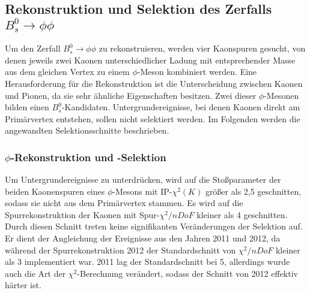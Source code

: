 \documentclass{article}
\begin{document}
\subsection{Rekonstruktion und Selektion des Zerfalls $B_s^0 \rightarrow \phi\phi$}

Um den Zerfall $B_s^0 \rightarrow \phi\phi$ zu rekonstruieren, werden vier Kaonspuren gesucht, von denen jeweils zwei Kaonen unterschiedlicher Ladung mit entsprechender Masse aus dem gleichen Vertex zu einem $\phi$-Meson kombiniert werden. Eine Herausforderung für die Rekonstruktion ist die Unterscheidung zwischen Kaonen und Pionen, da sie sehr ähnliche Eigenschaften besitzen. Zwei dieser $\phi$-Mesonen bilden einen $B_s^0$-Kandidaten. Untergrundereignisse, bei denen Kaonen direkt am Primärvertex entstehen, sollen nicht selektiert werden. Im Folgenden werden die angewandten Selektionsschnitte beschrieben. 

\subsubsection{$\phi$-Rekonstruktion und -Selektion}

Um Untergrundereignisse zu unterdrücken, wird auf die Stoßparameter der beiden Kaonenspuren eines $\phi$-Mesons mit IP-$\chi^2(K)$ größer als 2,5 geschnitten, sodass sie nicht aus dem Primärvertex stammen. 
Es wird auf die Spurrekonstruktion der Kaonen mit Spur-$\chi^2/nDoF$ kleiner als 4 geschnitten. %
Durch diesen Schnitt treten keine signifikanten Veränderungen der Selektion auf. Er dient der Angleichung der Ereignisse aus den Jahren 2011 und 2012, da während der Spurrekonstruktion 2012 der Standardschnitt von $\chi^2/nDoF$ kleiner als 3 implementiert war. 2011 lag der Standardschnitt bei 5, allerdings wurde auch die Art der $\chi^2$-Berechnung verändert, sodass der Schnitt von 2012 effektiv härter ist. 
\end{document}
